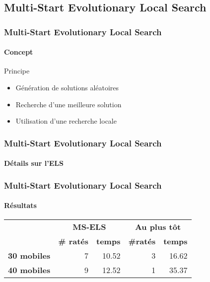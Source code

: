 \subsection{Multi-Start Evolutionary Local Search}
\begin{frame}
	\frametitle{Multi-Start Evolutionary Local Search}
	\framesubtitle{Concept}
	\begin{block}{Principe}
		\begin{itemize}
			\item Génération de solutions aléatoires
			\item Recherche d'une meilleure solution
			\item Utilisation d'une recherche locale
		\end{itemize}
	\end{block}
\end{frame}
\begin{frame}
	\frametitle{Multi-Start Evolutionary Local Search}
	\framesubtitle{Détails sur l'ELS}
	\centering
	\begin{tikzpicture}[scale=.5,transform shape,node distance=1cm]
		
	\end{tikzpicture}
\end{frame}
\begin{frame}
	\frametitle{Multi-Start Evolutionary Local Search}
	\framesubtitle{Résultats}
	\centering
	\begin{tabular}{l|c|r|c|r|}
		\cline{2-5}
		\multirow{2}{*}{}                         & \multicolumn{2}{c|}{\textbf{MS-ELS}}                         & \multicolumn{2}{c|}{\textbf{Au plus tôt}}                    \\ \cline{2-5} 
		                                          & \textbf{\# ratés}      & \multicolumn{1}{c|}{\textbf{temps}} & \textbf{\#ratés}       & \multicolumn{1}{c|}{\textbf{temps}} \\ \hline
		\multicolumn{1}{|r|}{\textbf{30 mobiles}} & \multicolumn{1}{r|}{7} & 10.52                               & \multicolumn{1}{r|}{3} & 16.62                               \\ \hline
		\multicolumn{1}{|r|}{\textbf{40 mobiles}} & \multicolumn{1}{r|}{9} & 12.52                               & \multicolumn{1}{r|}{1} & 35.37                               \\ \hline
	\end{tabular}
\end{frame}


